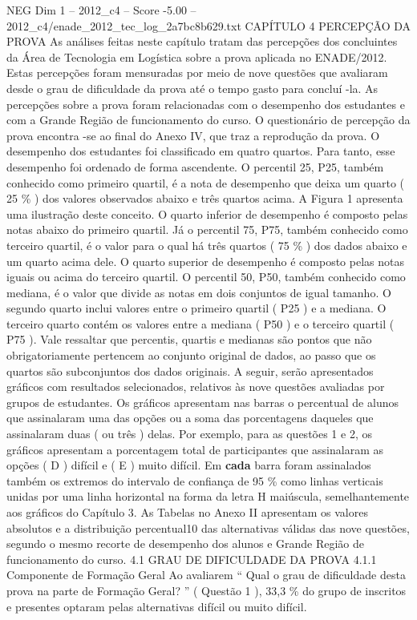 \begin{textsample}{NEG Dim 1 – 2012\_c4 – Score -5.00 – 2012\_c4/enade\_2012\_tec\_log\_2a7bc8b629.txt}  \label{ex:f1_neg_071}
CAPÍTULO 4 PERCEPÇÃO DA PROVA As análises feitas neste capítulo tratam das percepções dos concluintes da Área de Tecnologia em Logística sobre a prova aplicada no ENADE/2012.
Estas percepções foram mensuradas por meio de nove questões que avaliaram desde o grau de dificuldade da prova até o tempo gasto para concluí -la.
As percepções sobre a prova foram relacionadas com o desempenho dos estudantes e com a Grande Região de funcionamento do curso.
O questionário de percepção da prova encontra -se ao final do Anexo IV, que traz a reprodução da prova.
O desempenho dos estudantes foi classificado em quatro quartos.
Para tanto, esse desempenho foi ordenado de forma ascendente.
O percentil 25, P25, também conhecido como primeiro quartil, é a nota de desempenho que deixa um quarto ( 25 \% ) dos valores observados abaixo e três quartos acima.
A Figura 1 apresenta uma ilustração deste conceito.
O quarto inferior de desempenho é composto pelas notas abaixo do primeiro quartil.
Já o percentil 75, P75, também conhecido como terceiro quartil, é o valor para o qual há três quartos ( 75 \% ) dos dados abaixo e um quarto acima dele.
O quarto superior de desempenho é composto pelas notas iguais ou acima do terceiro quartil.
O percentil 50, P50, também conhecido como mediana, é o valor que divide as notas em dois conjuntos de igual tamanho.
O segundo quarto inclui valores entre o primeiro quartil ( P25 ) e a mediana.
O terceiro quarto contém os valores entre a mediana ( P50 ) e o terceiro quartil ( P75 ).
Vale ressaltar que percentis, quartis e medianas são pontos que não obrigatoriamente pertencem ao conjunto original de dados, ao passo que os quartos são subconjuntos dos dados originais.
A seguir, serão apresentados gráficos com resultados selecionados, relativos às nove questões avaliadas por grupos de estudantes.
Os gráficos apresentam nas barras o percentual de alunos que assinalaram uma das opções ou a soma das porcentagens daqueles que assinalaram duas ( ou três ) delas.
Por exemplo, para as questões 1 e 2, os gráficos apresentam a porcentagem total de participantes que assinalaram as opções ( D ) difícil e ( E ) muito difícil.
Em \textbf{cada} barra foram assinalados também os extremos do intervalo de confiança de 95 \% como linhas verticais unidas por uma linha horizontal na forma da letra H maiúscula, semelhantemente aos gráficos do Capítulo 3.
As Tabelas no Anexo II apresentam os valores absolutos e a distribuição percentual10 das alternativas válidas das nove questões, segundo o mesmo recorte de desempenho dos alunos e Grande Região de funcionamento do curso. 4.1 GRAU DE DIFICULDADE DA PROVA 4.1.1 Componente de Formação Geral Ao avaliarem “ Qual o grau de dificuldade desta prova na parte de Formação Geral? ” ( Questão 1 ), 33,3 \% do grupo de inscritos e presentes optaram pelas alternativas difícil ou muito difícil.

\end{textsample}
